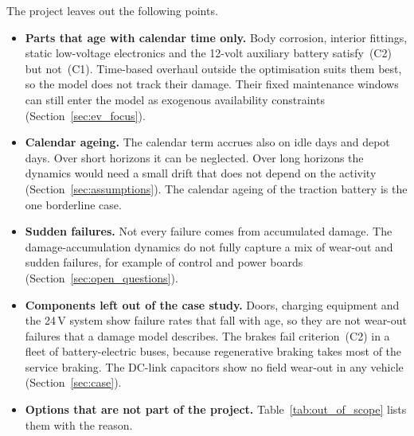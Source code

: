 \documentclass[11pt,a4paper]{article}
\theoremstyle{plain}
\theoremstyle{definition}
\theoremstyle{remark}
\begin{document}
The project leaves out the following points.
\begin{itemize}
  \item \textbf{Parts that age with calendar time only.}
    Body corrosion, interior fittings, static low-voltage electronics and the 12-volt auxiliary battery satisfy~(C2) but not~(C1).
    Time-based overhaul outside the optimisation suits them best, so the model does not track their damage.
    Their fixed maintenance windows can still enter the model as exogenous availability constraints (Section~\ref{sec:ev_focus}).
  \item \textbf{Calendar ageing.}
    The calendar term accrues also on idle days and depot days.
    Over short horizons it can be neglected.
    Over long horizons the dynamics would need a small drift that does not depend on the activity (Section~\ref{sec:assumptions}).
    The calendar ageing of the traction battery is the one borderline case.
  \item \textbf{Sudden failures.}
    Not every failure comes from accumulated damage.
    The damage-accumulation dynamics do not fully capture a mix of wear-out and sudden failures, for example of control and power boards (Section~\ref{sec:open_questions}).
  \item \textbf{Components left out of the case study.}
    Doors, charging equipment and the 24\,V system show failure rates that fall with age, so they are not wear-out failures that a damage model describes.
    The brakes fail criterion~(C2) in a fleet of battery-electric buses, because regenerative braking takes most of the service braking.
    The DC-link capacitors show no field wear-out in any vehicle (Section~\ref{sec:case}).
  \item \textbf{Options that are not part of the project.}
    Table~\ref{tab:out_of_scope} lists them with the reason.
\end{itemize}
\end{document}
